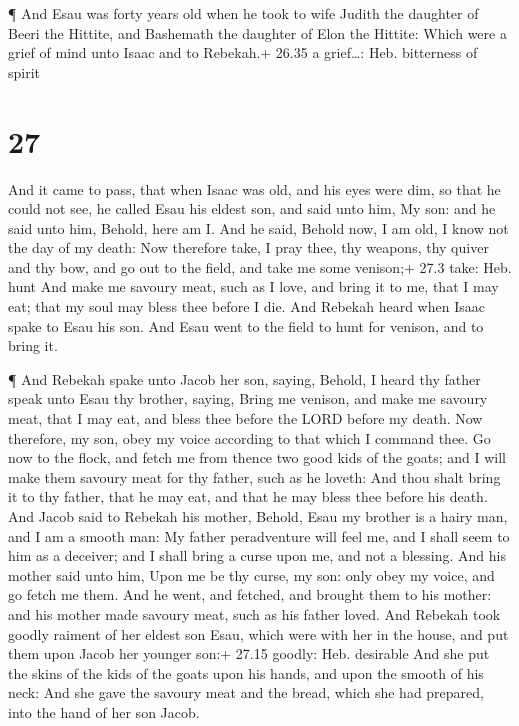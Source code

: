  ¶ And Esau was forty years old when he took to wife Judith
the daughter of Beeri the Hittite, and Bashemath the daughter of Elon
the Hittite:  Which were a grief of mind unto Isaac and to
Rebekah.+ 26.35 a grief\ldots: Heb. bitterness of spirit

\hypertarget{section-26}{%
\section{27}\label{section-26}}

 And it came to pass, that when Isaac was old, and his eyes
were dim, so that he could not see, he called Esau his eldest son, and
said unto him, My son: and he said unto him, Behold, here am I.
 And he said, Behold now, I am old, I know not the day of my
death:  Now therefore take, I pray thee, thy weapons, thy
quiver and thy bow, and go out to the field, and take me some venison;+
27.3 take: Heb. hunt  And make me savoury meat, such as I
love, and bring it to me, that I may eat; that my soul may bless thee
before I die.  And Rebekah heard when Isaac spake to Esau
his son. And Esau went to the field to hunt for venison, and to bring
it.

 ¶ And Rebekah spake unto Jacob her son, saying, Behold, I
heard thy father speak unto Esau thy brother, saying,  Bring
me venison, and make me savoury meat, that I may eat, and bless thee
before the LORD before my death.  Now therefore, my son,
obey my voice according to that which I command thee.  Go
now to the flock, and fetch me from thence two good kids of the goats;
and I will make them savoury meat for thy father, such as he loveth:
 And thou shalt bring it to thy father, that he may eat,
and that he may bless thee before his death.  And Jacob
said to Rebekah his mother, Behold, Esau my brother is a hairy man, and
I am a smooth man:  My father peradventure will feel me,
and I shall seem to him as a deceiver; and I shall bring a curse upon
me, and not a blessing.  And his mother said unto him, Upon
me be thy curse, my son: only obey my voice, and go fetch me them.
 And he went, and fetched, and brought them to his mother:
and his mother made savoury meat, such as his father loved.
 And Rebekah took goodly raiment of her eldest son Esau,
which were with her in the house, and put them upon Jacob her younger
son:+ 27.15 goodly: Heb. desirable  And she put the skins
of the kids of the goats upon his hands, and upon the smooth of his
neck:  And she gave the savoury meat and the bread, which
she had prepared, into the hand of her son Jacob.


